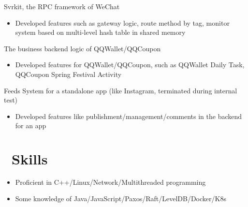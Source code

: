 \documentclass{resume}
\begin{document}
Svrkit, the RPC framework of WeChat
\begin{itemize}
  \item Developed features such as gateway logic, route method by tag, monitor system based on multi-level hash table in shared memory
\end{itemize}

The business backend logic of QQWallet/QQCoupon
\begin{itemize}
  \item Developed features for QQWallet/QQCoupon, such as QQWallet Daily Task, QQCoupon Spring Festival Activity
\end{itemize}

Feeds System for a standalone app (like Instagram, terminated during internal test)
\begin{itemize}
  \item Developed features like publishment/management/comments in the backend for an app
\end{itemize}




\section{\faCogs\ Skills}
\begin{itemize}[parsep=0.5ex]
  \item Proficient in C++/Linux/Network/Multithreaded programming
  \item Some knowledge of Java/JavaScript/Paxos/Raft/LevelDB/Docker/K8s
\end{itemize}



%
%
\end{document}

